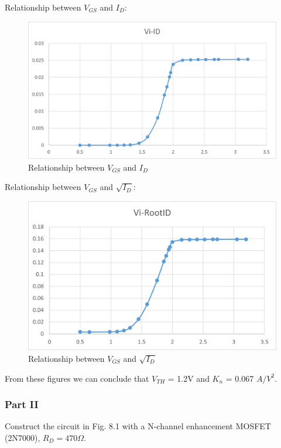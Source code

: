     \FloatBarrier
    Relationship between $V_{GS}$ and $I_D$:\\
    \begin{figure}[h]
        \centering
        \includegraphics[width=0.5\linewidth]{Lab08/L8_DCF2.png}
        \caption{Relationship between $V_{GS}$ and $I_D$}
        \label{l8dctf2}
    \end{figure}
    \FloatBarrier
    Relationship between $V_{GS}$ and $\sqrt{I_D}$:\\
    \begin{figure}[h]
        \centering
        \includegraphics[width=0.65\linewidth]{Lab08/L8_DCF3.png}
        \caption{Relationship between $V_{GS}$ and $\sqrt{I_D}$}
        \label{L8dctf3}
    \end{figure}
\FloatBarrier
    From these figures we can conclude that $V_{TH}$ = 1.2V and $K_n$ =  0.067 $A/V^2$.

    \subsubsection{Part II}
    Construct the circuit in Fig. 8.1 with a N-channel enhancement MOSFET (2N7000), $R_D = 470\Omega$.
    

